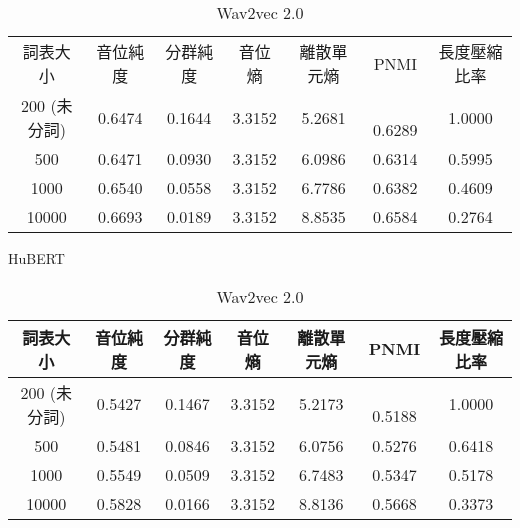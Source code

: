         \begin{table}[!htbp]
            \centering
            \begin{subtable}[t]{\textwidth}
                \centering
                \begin{tabular}{|c|c|c|c|c|c|c|} \hline 
                        詞表大小  & 音位純度 & 分群純度 & 音位熵 & 離散單元熵 &    PNMI & 長度壓縮比率 \\
 200 (未分詞)&   0.6474 &   0.1644 & 3.3152 &     5.2681 &　0.6289 &1.0000\\ \hline 
                            500   & 0.6471   & 0.0930   & 3.3152 &  6.0986    &  0.6314 &  0.5995  \\ \hline %
                           1000   & 0.6540   & 0.0558   & 3.3152 &  6.7786    &  0.6382 &  0.4609  \\ \hline %
                          10000   & 0.6693   & 0.0189   & 3.3152 &  8.8535    &  0.6584 &  0.2764  \\ \hline %
                \end{tabular}
\caption{HuBERT}
                \label{tab:ch4-phn-model-hubert}
            \end{subtable}        

            \vspace{0.01cm}        

            \begin{subtable}[t]{\textwidth}
                \centering
                \begin{tabular}{|c|c|c|c|c|c|c|} \hline 
                        詞表大小  & 音位純度 & 分群純度 & 音位熵 & 離散單元熵 &    PNMI & 長度壓縮比率 \\ \hline 
 200 (未分詞)&   0.5427 &   0.1467 & 3.3152 &     5.2173 &　0.5188 &1.0000\\ \hline 
                            500   & 0.5481   & 0.0846   & 3.3152 &  6.0756    &  0.5276 &  0.6418  \\ \hline %
                           1000   & 0.5549   & 0.0509   & 3.3152 &  6.7483    &  0.5347 &  0.5178  \\ \hline %
                          10000   & 0.5828   & 0.0166   & 3.3152 &  8.8136    &  0.5668 &  0.3373  \\ \hline %
                \end{tabular}
\caption{Wav2vec 2.0}
                \label{tab:ch4-phn-model-w2v2}
            \end{subtable}        


\end{table}
